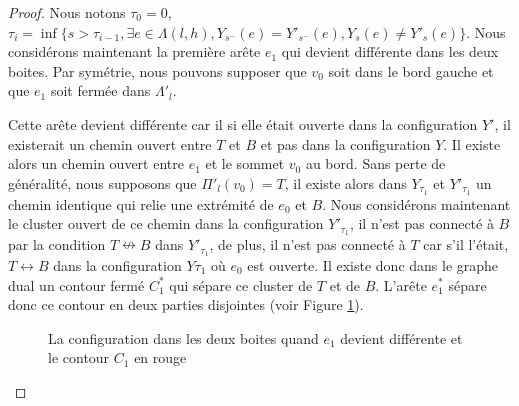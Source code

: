 \documentclass[titlepage,a4paper,12pt]{article}
\newcounter{cor}
\begin{document}
\begin{proof}
Nous notons $\tau_0 = 0$, $\tau_i = \inf \{s > \tau_{i-1}, \exists e \in \Lambda(l,h),Y_{s^-}(e) = Y'_{s^-}(e),Y_s(e) \neq Y'_s(e)\}$. Nous considérons maintenant la première arête $e_1$ qui devient différente dans les deux boites. Par symétrie, nous pouvons supposer que $v_0$ soit dans le bord gauche et que $e_1$ soit fermée dans $\Lambda'_l$.

Cette arête devient différente car il si elle était ouverte dans la configuration $Y'$, il existerait un chemin ouvert entre $T$ et $B$ et pas dans la configuration $Y$. Il existe alors un chemin ouvert entre $e_1$ et le sommet $v_0$ au bord. Sans perte de généralité, nous supposons que $\Pi'_l(v_0)=T$, il existe alors dans $Y_{\tau_1}$ et $Y'_{\tau_1}$ un chemin identique qui relie une extrémité de $e_0$ et $B$. Nous considérons maintenant le cluster ouvert de ce chemin dans la configuration $Y'_{\tau_1}$, il n'est pas connecté à $B$ par la condition $T\nleftrightarrow B$ dans $Y'_{\tau_1}$, de plus, il n'est pas connecté à $T$ car s'il l'était, $T\longleftrightarrow B$ dans la configuration $Y{\tau_1}$ où $e_0$ est ouverte. Il existe donc dans le graphe dual un contour fermé $C^*_1$ qui sépare ce cluster de $T$ et de $B$. L'arête $e^*_1$ sépare donc ce contour en deux parties disjointes (voir Figure \ref{fig:e1}). 
\begin{figure}[h]
\begin{minipage}{0.45\linewidth}
\center
{}
\end{minipage}
\begin{minipage}{0.45\linewidth}
\center
{}
\end{minipage}
\caption{La configuration dans les deux boites quand $e_1$ devient différente et le contour $C_1$ en rouge}
\label{fig:e1}
\end{figure}


\end{proof}
\end{document}
